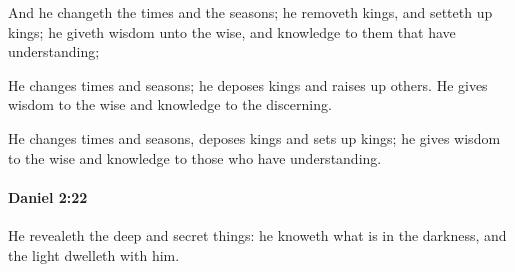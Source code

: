 			\begin{versebox}
					\item[BHS] 
					\item[LXX] 
					\item[ASV] And he changeth the times and the seasons; he removeth kings, and setteth up kings; he giveth wisdom unto the wise, and knowledge to them that have understanding;
					\item[NIV] He changes times and seasons; he deposes kings and raises up others. He gives wisdom to the wise and knowledge to the discerning.
					\item[NRSV] He changes times and seasons, deposes kings and sets up kings; he gives wisdom to the wise and knowledge to those who have understanding.
			\end{versebox}

		\paragraph{Daniel 2:22} %
			\label{DANIEL-2-22}

			He revealeth the deep and secret things: he knoweth what is in the darkness, and the light dwelleth with him.

